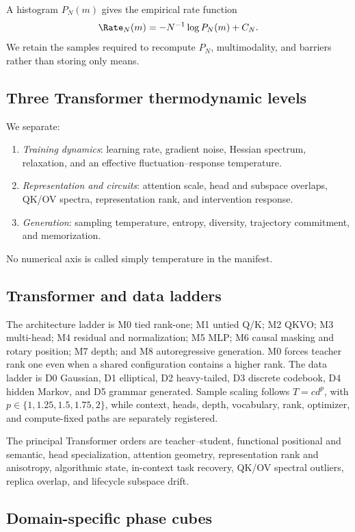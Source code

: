 A histogram \(P_N(m)\) gives the empirical rate function
\[
  \Rate_N(m)=-N^{-1}\log P_N(m)+C_N.
\]
We retain the samples required to recompute \(P_N\), multimodality, and barriers rather
than storing only means.

\subsection{Three Transformer thermodynamic levels}

We separate:
\begin{enumerate}
\item \emph{Training dynamics}: learning rate, gradient noise, Hessian spectrum, relaxation,
and an effective fluctuation--response temperature.
\item \emph{Representation and circuits}: attention scale, head and subspace overlaps,
QK/OV spectra, representation rank, and intervention response.
\item \emph{Generation}: sampling temperature, entropy, diversity, trajectory commitment,
and memorization.
\end{enumerate}
No numerical axis is called simply temperature in the manifest.

\subsection{Transformer and data ladders}

The architecture ladder is M0 tied rank-one; M1 untied Q/K; M2 QKVO; M3 multi-head; M4
residual and normalization; M5 MLP; M6 causal masking and rotary position; M7 depth; and M8
autoregressive generation. M0 forces teacher rank one even when a shared configuration
contains a higher rank. The data ladder is D0 Gaussian, D1 elliptical, D2 heavy-tailed,
D3 discrete codebook, D4 hidden Markov, and D5 grammar generated. Sample scaling follows
\(T=c d^p\), with \(p\in\{1,1.25,1.5,1.75,2\}\), while context, heads, depth,
vocabulary, rank, optimizer, and compute-fixed paths are separately registered.

The principal Transformer orders are teacher--student, functional positional and semantic,
head specialization, attention geometry, representation rank and anisotropy, algorithmic
state, in-context task recovery, QK/OV spectral outliers, replica overlap, and lifecycle
subspace drift.

\subsection{Domain-specific phase cubes}

